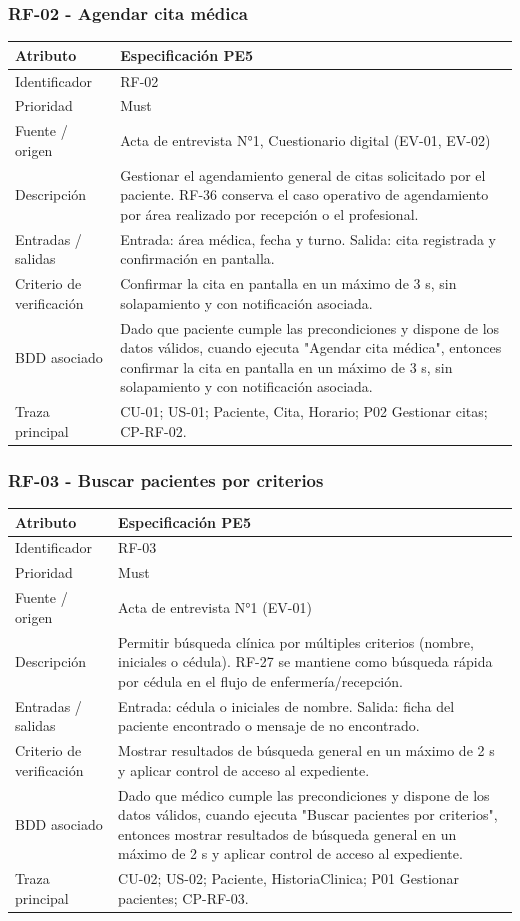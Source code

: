 \documentclass[11pt,a4paper]{article}
\begin{document}
	\subsubsection{RF-02 - Agendar cita médica}
	\begin{tabularx}{\textwidth}{p{3.2cm}Y}
		\toprule
		\textbf{Atributo} & \textbf{Especificación PE5}\\\midrule
		Identificador & RF-02\\
		Prioridad & Must\\
		Fuente / origen & Acta de entrevista N°1, Cuestionario digital (EV-01, EV-02)\\
		Descripción & Gestionar el agendamiento general de citas solicitado por el paciente. RF-36 conserva el caso operativo de agendamiento por área realizado por recepción o el profesional.\\
		Entradas / salidas & Entrada: área médica, fecha y turno. Salida: cita registrada y confirmación en pantalla.\\
		Criterio de verificación & Confirmar la cita en pantalla en un máximo de 3 s, sin solapamiento y con notificación asociada.\\
		BDD asociado & Dado que paciente cumple las precondiciones y dispone de los datos válidos, cuando ejecuta "Agendar cita médica", entonces confirmar la cita en pantalla en un máximo de 3 s, sin solapamiento y con notificación asociada.\\
		Traza principal & CU-01; US-01; Paciente, Cita, Horario; P02 Gestionar citas; CP-RF-02.\\
		\bottomrule
	\end{tabularx}
	\clearpage
	\subsubsection{RF-03 - Buscar pacientes por criterios}
	\begin{tabularx}{\textwidth}{p{3.2cm}Y}
		\toprule
		\textbf{Atributo} & \textbf{Especificación PE5}\\\midrule
		Identificador & RF-03\\
		Prioridad & Must\\
		Fuente / origen & Acta de entrevista N°1 (EV-01)\\
		Descripción & Permitir búsqueda clínica por múltiples criterios (nombre, iniciales o cédula). RF-27 se mantiene como búsqueda rápida por cédula en el flujo de enfermería/recepción.\\
		Entradas / salidas & Entrada: cédula o iniciales de nombre. Salida: ficha del paciente encontrado o mensaje de no encontrado.\\
		Criterio de verificación & Mostrar resultados de búsqueda general en un máximo de 2 s y aplicar control de acceso al expediente.\\
		BDD asociado & Dado que médico cumple las precondiciones y dispone de los datos válidos, cuando ejecuta "Buscar pacientes por criterios", entonces mostrar resultados de búsqueda general en un máximo de 2 s y aplicar control de acceso al expediente.\\
		Traza principal & CU-02; US-02; Paciente, HistoriaClinica; P01 Gestionar pacientes; CP-RF-03.\\
		\bottomrule
	\end{tabularx}
\end{document}
